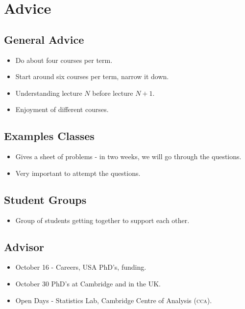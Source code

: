 \chapter{Advice}
\label{cha:advice}

\section{General Advice}
\label{sec:general-advice}

\begin{itemize}
\item Do about four courses per term.
\item Start around six courses per term, narrow it down.
\item Understanding lecture $N$ before lecture $N+1$.
\item Enjoyment of different courses.
\end{itemize}

\section{Examples Classes}
\label{sec:examples-classes}

\begin{itemize}
\item Gives a sheet of problems - in two weeks, we will go through the questions.
\item Very important to attempt the questions.
\end{itemize}

\section{Student Groups}
\label{sec:student-groups}

\begin{itemize}
\item Group of students getting together to support each other.
\end{itemize}

\section{Advisor}
\label{sec:advisor}

\begin{itemize}
\item October 16 - Careers, USA PhD's, funding.
\item October 30 PhD's at Cambridge and in the UK.
\item Open Days - Statistics Lab, Cambridge Centre of Analysis
  (\textsc{cca}).
\end{itemize}

